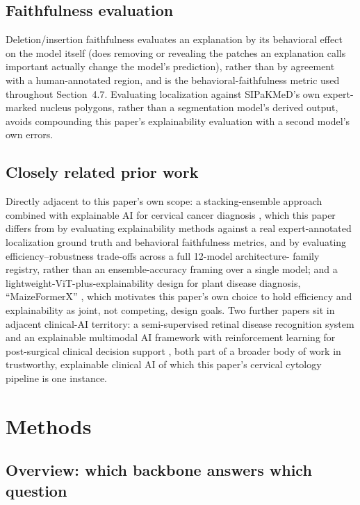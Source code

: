 \documentclass[runningheads]{llncs}
\begin{document}
\subsection{Faithfulness evaluation}

Deletion/insertion faithfulness \cite{petsiuk2018rise} evaluates an
explanation by its behavioral effect on the model itself (does removing
or revealing the patches an explanation calls important actually change
the model's prediction), rather than by agreement with a human-annotated
region, and is the behavioral-faithfulness metric used throughout
Section~4.7. Evaluating localization against SIPaKMeD's own expert-marked
nucleus polygons, rather than a segmentation model's derived output,
avoids compounding this paper's explainability evaluation with a second
model's own errors.

\subsection{Closely related prior work}

Directly adjacent to this paper's own scope: a stacking-ensemble approach
combined with explainable AI for cervical cancer diagnosis
\cite{mohiuddin2025}, which this paper differs from by evaluating
explainability methods against a real expert-annotated localization
ground truth and behavioral faithfulness metrics, and by evaluating
efficiency--robustness trade-offs across a full 12-model architecture-
family registry, rather than an ensemble-accuracy framing over a single
model; and a lightweight-ViT-plus-explainability design for plant disease
diagnosis, ``MaizeFormerX'' \cite{rahman2026maizeformerx}, which
motivates this paper's own choice to hold efficiency and explainability as
joint, not competing, design goals. Two further papers sit in adjacent
clinical-AI territory: a semi-supervised retinal disease recognition
system \cite{gony2026retinal} and an explainable multimodal AI framework
with reinforcement learning for post-surgical clinical decision support
\cite{ahmed2026postsurgical}, both part of a broader body of work in
trustworthy, explainable clinical AI of which this paper's cervical
cytology pipeline is one instance.

\section{Methods}

\subsection{Overview: which backbone answers which question}
\end{document}
